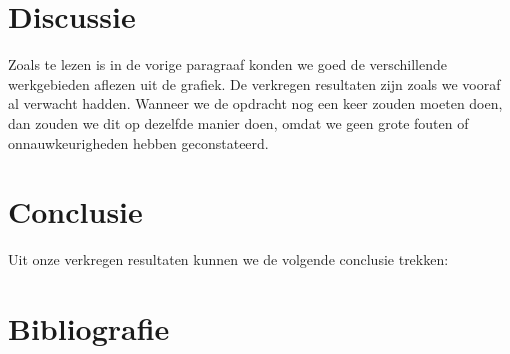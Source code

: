\documentclass{scrartcl}  %
\begin{document}
\section{Discussie}
Zoals te lezen is in de vorige paragraaf konden we goed de verschillende werkgebieden aflezen uit de grafiek. De verkregen resultaten zijn zoals we vooraf al verwacht hadden. Wanneer we de opdracht nog een keer zouden moeten doen, dan zouden we dit op dezelfde manier doen, omdat we geen grote fouten of onnauwkeurigheden hebben geconstateerd. 

\section{Conclusie}
Uit onze verkregen resultaten kunnen we de volgende conclusie trekken: 

\section{Bibliografie}
\printbibliography
\end{document}
